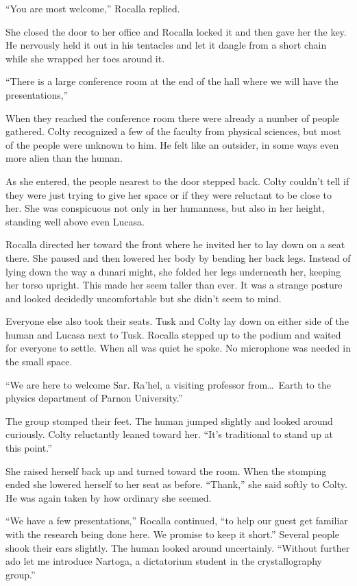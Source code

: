 ``You are most welcome,'' Rocalla replied.

She closed the door to her office and Rocalla locked it and then gave her the key. He nervously
held it out in his tentacles and let it dangle from a short chain while she wrapped her toes
around it.

``There is a large conference room at the end of the hall where we will have the
presentations,''

When they reached the conference room there were already a number of people gathered. Colty
recognized a few of the faculty from physical sciences, but most of the people were unknown to
him. He felt like an outsider, in some ways even more alien than the human.

As she entered, the people nearest to the door stepped back. Colty couldn't tell if they were
just trying to give her space or if they were reluctant to be close to her. She was conspicuous
not only in her humanness, but also in her height, standing well above even Lucasa.

Rocalla directed her toward the front where he invited her to lay down on a seat there. She
paused and then lowered her body by bending her back legs. Instead of lying down the way a
dunari might, she folded her legs underneath her, keeping her torso upright. This made her seem
taller than ever. It was a strange posture and looked decidedly uncomfortable but she didn't
seem to mind.

Everyone else also took their seats. Tusk and Colty lay down on either side of the human and
Lucasa next to Tusk. Rocalla stepped up to the podium and waited for everyone to settle. When
all was quiet he spoke. No microphone was needed in the small space.

``We are here to welcome Sar. Ra'hel, a visiting professor from\ldots\ Earth to the physics
department of Parnon University.''

The group stomped their feet. The human jumped slightly and looked around curiously. Colty
reluctantly leaned toward her. ``It's traditional to stand up at this point.''

She raised herself back up and turned toward the room. When the stomping ended she lowered
herself to her seat as before. ``Thank,'' she said softly to Colty. He was again taken by how
ordinary she seemed.

``We have a few presentations,'' Rocalla continued, ``to help our guest get familiar with the
research being done here. We promise to keep it short.'' Several people shook their ears
slightly. The human looked around uncertainly. ``Without further ado let me introduce Nartoga, a
dictatorium student in the crystallography group.''


